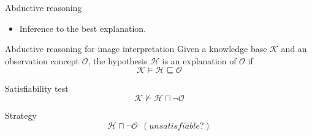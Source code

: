 \documentclass{beamer}
\begin{document}
\begin{frame}{Abductive reasoning}
\begin{itemize}
 \item Inference to the best explanation.
\end{itemize}
\begin{block}{Abductive reasoning for image interpretation}
 Given a knowledge base $\mathcal{K}$ and an observation concept $\mathcal{O}$, the  hypothesis $\mathcal{H}$ is an explanation of  $\mathcal{O}$ if  $$\mathcal{K}\vDash \mathcal{H}\sqsubseteq \mathcal{O}$$
\end{block}

\begin{block}{Satisfiability test}
$$\mathcal{K}\nvDash \mathcal{H}\sqcap \neg \mathcal{O}$$
\end{block}

\begin{exampleblock}{Strategy}
 $$\mathcal{H}\sqcap \neg\mathcal{O}~~(unsatisfiable?)$$ 
 
\end{exampleblock}
\end{frame}
\end{document}
